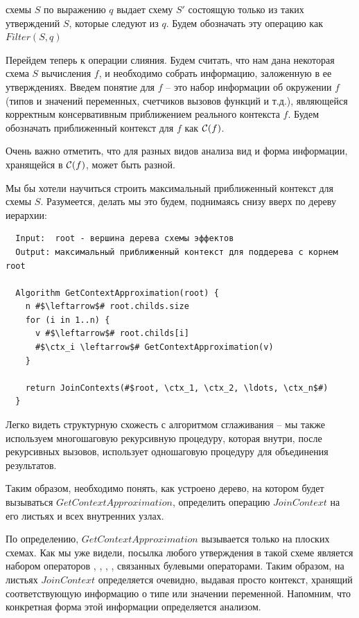 \begin{definition}
     схемы $S$ по выражению $q$ выдает схему $S'$ состоящую только из таких утверждений $S$, которые следуют из $q$. Будем обозначать эту операцию как $Filter(S, q)$
\end{definition}


\bigskip

Перейдем теперь к операции слияния. Будем считать, что нам дана некоторая схема $S$ вычисления $f$, и необходимо собрать информацию, заложенную в ее утверждениях. Введем понятие  для $f$ -- это набор информации об окружении $f$ (типов и значений переменных, счетчиков вызовов функций и т.д.), являющейся корректным консервативным приближением реального контекста $f$. Будем обозначать приближенный контекст для $f$ как $\mathcal{C}(f)$.

Очень важно отметить, что для разных видов анализа вид и форма информации, хранящейся в $\mathcal{C}(f)$, может быть разной.

Мы бы хотели научиться строить максимальный приближенный контекст для схемы $S$. Разумеется, делать мы это будем, поднимаясь снизу вверх по дереву иерархии:

\begin{verbatim}
  Input:  root - вершина дерева схемы эффектов
  Output: максимальный приближенный контекст для поддерева с корнем root

  Algorithm GetContextApproximation(root) {
    n #$\leftarrow$# root.childs.size
    for (i in 1..n) {
      v #$\leftarrow$# root.childs[i]
      #$\ctx_i \leftarrow$# GetContextApproximation(v)
    }

    return JoinContexts(#$root, \ctx_1, \ctx_2, \ldots, \ctx_n$#)
  }
\end{verbatim}

Легко видеть структурную схожесть с алгоритмом сглаживания -- мы также используем многошаговую рекурсивную процедуру, которая внутри, после рекурсивных вызовов, использует одношаговую процедуру для объединения результатов.

Таким образом, необходимо понять, как устроено дерево, на котором будет вызываться $GetContextApproximation$, определить операцию $JoinContext$ на его листьях и всех внутренних узлах.

По определению, $GetContextApproximation$ вызывается только на плоских схемах. Как мы уже видели, посылка любого утверждения в такой схеме является набором операторов , \code{==}, , \code{!=}, связанных булевыми операторами. Таким образом, на листьях $JoinContext$ определяется очевидно, выдавая просто контекст, хранящий соответствующую информацию о типе или значении переменной. Напомним, что конкретная форма этой информации определяется анализом.

